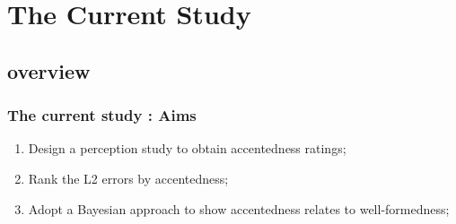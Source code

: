 \documentclass{beamer}
\begin{document}
\section{The Current Study}
\subsection{overview}
\begin{frame}
\frametitle{The current study : Aims}
\begin{enumerate}
\item{Design a perception study to obtain accentedness ratings;}\linebreak
\item{Rank the L2 errors by accentedness;}\linebreak
\item{Adopt a Bayesian approach to show accentedness relates to well-formedness;}\linebreak
\end{enumerate}
\end{frame}

\end{document}
